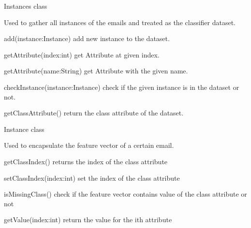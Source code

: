 \begin{my_itemize}
\begin{my_desc}
  \end{my_desc}


  \item Instances class
  \begin{my_desc}
    \item[Purpose] Used to gather all instances of the emails and treated as the classifier
      dataset.
    \item[Fuctions] \hfill
    \begin{my_itemize}
      \item add(instance:Instance) add new instance to the dataset.
      \item getAttribute(index:int) get Attribute at given index.
      \item getAttribute(name:String) get Attribute with the given name.
      \item checkInstance(instance:Instance) check if the given instance is in the dataset or not.
      \item getClassAttribute() return the class attribute of the dataset.
    \end{my_itemize}

  \end{my_desc}

  \item Instance class
  \begin{my_desc}
    \item[Purpose] Used to encapsulate the feature vector of a certain email.
    \item[Functions] \hfill
    \begin{my_itemize}
      \item getClassIndex() returns the index of the class attribute
      \item setClassIndex(index:int) set the index of the class attribute
      \item isMissingClass() check if the feature vector contains value of the class attribute or not
      \item getValue(index:int) return the value for the ith attribute
    \end{my_itemize}

  \end{my_desc}


\end{my_itemize}
